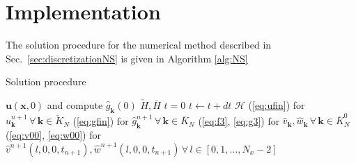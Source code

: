 \documentclass[11pt, oneside]{article}
\newcommand{\N}[1]{\check{#1}}
\newcommand{\D}[1]{\overline{#1}}
\begin{document}
\section{Implementation}

The solution procedure for the numerical method described in 
Sec.~\ref{sec:discretizationNS} is given in Algorithm \ref{alg:NS}

\begin{algorithm}
	\caption{Solution procedure}
    \label{alg:NS}
    \begin{algorithmic}[1]
    	\State {} $\bm{u}(\bm{x}, 0)$ and compute 
    	$\hat{g}_{\bm{k}}(0)$
		\State {} $\N{H}, \D{H}$
		\State $t=0$
	    	\State $t \gets t+dt$
	    	\State {} $\bm{\mathcal{H}}$
		    \State {}(\ref{eq:ufin}) for 
		    $\hat{u}^{n+1}_{\bm{k}} \, \forall \,\bm{k} \in \N{K}_N$
		    \State {}(\ref{eq:gfin}) for 
		    $\hat{g}^{n+1}_{\bm{k}} \, \forall\, \bm{k} \in \D{K}_N$
		    \State {}(\ref{eq:f3}, \ref{eq:g3}) for  
		    $\hat{v}_{\bm{k}}, \hat{w}_{\bm{k}}\, \forall\, \bm{k} 
		    \in \D{K}_N^0$
		    \State {}(\ref{eq:v00}, \ref{eq:w00}) for 
		    $\hat{v}^{n+1}(l, 0, 0, t_{n+1}), \hat{w}^{n+1}(l, 0, 0, t_{n+1})\, 
		    \forall \, l \in [0, 1, \ldots, N_x-2] $
		    \State {}
	    \EndWhile 
	    	
    \end{algorithmic}
\end{algorithm}
\end{document}
